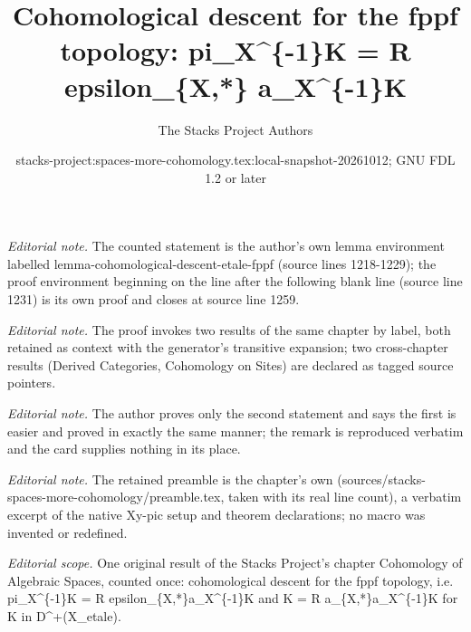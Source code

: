 \documentclass{stacks-project}
\title{Cohomological descent for the fppf topology: pi\_X\textasciicircum{}\{-1\}K = R epsilon\_\{X,*\} a\_X\textasciicircum{}\{-1\}K}
\author{The Stacks Project Authors}
\date{stacks-project:spaces-more-cohomology.tex:local-snapshot-20261012; GNU FDL 1.2 or later}
\theoremstyle{plain}
\theoremstyle{definition}
\theoremstyle{remark}
\numberwithin{equation}{subsection}
\begin{document}
\maketitle
\noindent\textit{Editorial note.} The counted statement is the author's own lemma environment labelled lemma-cohomological-descent-etale-fppf (source lines 1218-1229); the proof environment beginning on the line after the following blank line (source line 1231) is its own proof and closes at source line 1259.\par\medskip
\noindent\textit{Editorial note.} The proof invokes two results of the same chapter by label, both retained as context with the generator's transitive expansion; two cross-chapter results (Derived Categories, Cohomology on Sites) are declared as tagged source pointers.\par\medskip
\noindent\textit{Editorial note.} The author proves only the second statement and says the first is easier and proved in exactly the same manner; the remark is reproduced verbatim and the card supplies nothing in its place.\par\medskip
\noindent\textit{Editorial note.} The retained preamble is the chapter's own (sources/stacks-spaces-more-cohomology/preamble.tex, taken with its real line count), a verbatim excerpt of the native Xy-pic setup and theorem declarations; no macro was invented or redefined.\par\medskip
\noindent\textit{Editorial scope.} One original result of the Stacks Project's chapter Cohomology of Algebraic Spaces, counted once: cohomological descent for the fppf topology, i.e. pi\_X\textasciicircum{}\{-1\}K = R epsilon\_\{X,*\}a\_X\textasciicircum{}\{-1\}K and K = R a\_\{X,*\}a\_X\textasciicircum{}\{-1\}K for K in D\textasciicircum{}+(X\_etale).\par\medskip
\end{document}
